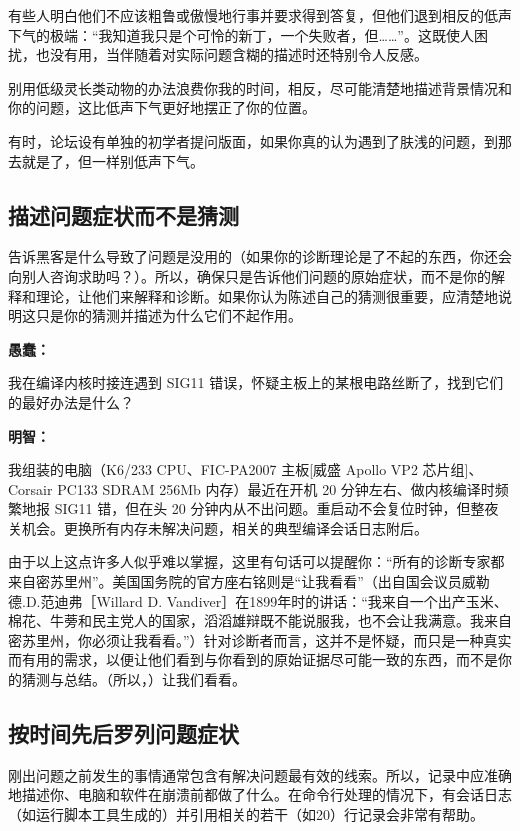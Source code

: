有些人明白他们不应该粗鲁或傲慢地行事并要求得到答复，但他们退到相反的低声下气的极端：“我知道我只是个可怜的新丁，一个失败者，但……”。这既使人困扰，也没有用，当伴随着对实际问题含糊的描述时还特别令人反感。

别用低级灵长类动物的办法浪费你我的时间，相反，尽可能清楚地描述背景情况和你的问题，这比低声下气更好地摆正了你的位置。

有时，论坛设有单独的初学者提问版面，如果你真的认为遇到了肤浅的问题，到那去就是了，但一样别低声下气。




\subsection{描述问题症状而不是猜测}

告诉黑客是什么导致了问题是没用的（如果你的诊断理论是了不起的东西，你还会向别人咨询求助吗？）。所以，确保只是告诉他们问题的原始症状，而不是你的解释和理论，让他们来解释和诊断。如果你认为陈述自己的猜测很重要，应清楚地说明这只是你的猜测并描述为什么它们不起作用。

\textbf{愚蠢：}

我在编译内核时接连遇到 SIG11 错误，怀疑主板上的某根电路丝断了，找到它们的最好办法是什么？

\textbf{明智：}

我组装的电脑（K6/233 CPU、FIC-PA2007 主板[威盛 Apollo VP2 芯片组]、Corsair PC133 SDRAM 256Mb 内存）最近在开机 20 分钟左右、做内核编译时频繁地报 SIG11 错，但在头 20 分钟内从不出问题。重启动不会复位时钟，但整夜关机会。更换所有内存未解决问题，相关的典型编译会话日志附后。

由于以上这点许多人似乎难以掌握，这里有句话可以提醒你：“所有的诊断专家都来自密苏里州”。美国国务院的官方座右铭则是“让我看看”（出自国会议员威勒德.D.范迪弗［Willard D. Vandiver］在1899年时的讲话：“我来自一个出产玉米、棉花、牛蒡和民主党人的国家，滔滔雄辩既不能说服我，也不会让我满意。我来自密苏里州，你必须让我看看。”）针对诊断者而言，这并不是怀疑，而只是一种真实而有用的需求，以便让他们看到与你看到的原始证据尽可能一致的东西，而不是你的猜测与总结。（所以，）让我们看看。




\subsection{按时间先后罗列问题症状}

刚出问题之前发生的事情通常包含有解决问题最有效的线索。所以，记录中应准确地描述你、电脑和软件在崩溃前都做了什么。在命令行处理的情况下，有会话日志（如运行脚本工具生成的）并引用相关的若干（如20）行记录会非常有帮助。

